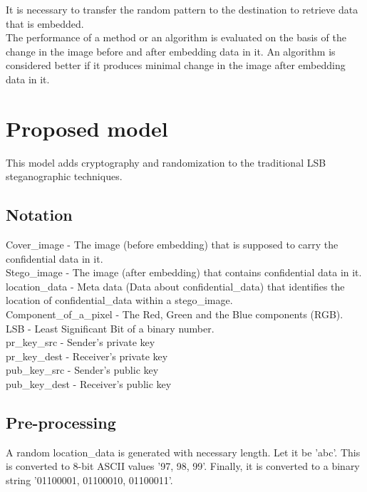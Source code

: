 \documentclass[conference]{IEEEtran}
\begin{document}
It is necessary to transfer the random pattern to the destination to retrieve data that is embedded. \\


The performance of a method or an algorithm is evaluated on the basis of the change in the image before and after embedding data in it.
An algorithm is considered better if it produces minimal change in the image after embedding data in it.\\

\section{Proposed model}
This model adds cryptography and randomization to the traditional LSB steganographic techniques.

\subsection{Notation}
Cover\_image - The image (before embedding) that is supposed to carry the confidential data in it. \\

Stego\_image - The image (after embedding) that contains confidential data in it. \\

location\_data - Meta data (Data about confidential\_data) that identifies the location of confidential\_data within a stego\_image. \\

Component\_of\_a\_pixel - The Red, Green and the Blue components (RGB). \\

LSB - Least Significant Bit of a binary number. \\

pr\_key\_src - Sender's private key \\

pr\_key\_dest - Receiver's private key \\

pub\_key\_src - Sender's public key \\

pub\_key\_dest - Receiver's public key \\

\subsection{Pre-processing}
A random location\_data is generated with necessary length. Let it be 'abc'.
This is converted to 8-bit ASCII values '97, 98, 99'.
Finally, it is converted to a binary string '01100001, 01100010, 01100011'.\\
\end{document}
